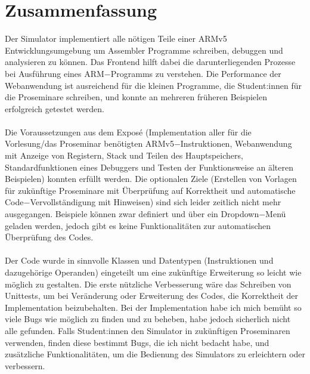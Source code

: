 \documentclass[a4paper, 11pt, onecolumn]{article}
\begin{document}
\newpage
\section{Zusammenfassung}\label{sec:summary}

Der Simulator implementiert alle nötigen Teile einer ARMv5 Entwicklungsumgebung um Assembler Programme schreiben, debuggen und analysieren zu können. Das Frontend hilft dabei die darunterliegenden Prozesse bei Ausführung eines ARM$-$Programms zu verstehen. Die Performance der Webanwendung ist ausreichend für die kleinen Programme, die Student:innen für die Proseminare schreiben, und konnte an mehreren früheren Beispielen erfolgreich getestet werden. \\ \\
Die Voraussetzungen aus dem Exposé (Implementation aller für die Vorlesung/das Proseminar benötigten ARMv5$-$Instruktionen, Webanwendung mit Anzeige von Registern, Stack und Teilen des Hauptspeichers, Standardfunktionen eines Debuggers und Testen der Funktionsweise an älteren Beispielen) konnten erfüllt werden. Die optionalen Ziele (Erstellen von Vorlagen für zukünftige Proseminare mit Überprüfung auf Korrektheit und automatische Code$-$Vervollständigung mit Hinweisen) sind sich leider zeitlich nicht mehr ausgegangen. Beispiele können zwar definiert und über ein Dropdown$-$Menü geladen werden, jedoch gibt es keine Funktionalitäten zur automatischen Überprüfung des Codes. \\ \\
Der Code wurde in sinnvolle Klassen und Datentypen (Instruktionen und dazugehörige Operanden) eingeteilt um eine zukünftige Erweiterung so leicht wie möglich zu gestalten. Die erste nützliche Verbesserung wäre das Schreiben von Unittests, um bei Veränderung oder Erweiterung des Codes, die Korrektheit der Implementation beizubehalten. Bei der Implementation habe ich mich bemüht so viele Bugs wie möglich zu finden und zu beheben, habe jedoch sicherlich nicht alle gefunden. Falls Student:innen den Simulator in zukünftigen Proseminaren verwenden, finden diese bestimmt Bugs, die ich nicht bedacht habe, und zusätzliche Funktionalitäten, um die Bedienung des Simulators zu erleichtern oder verbessern.

\newpage



\newpage
\appendix
\end{document}

